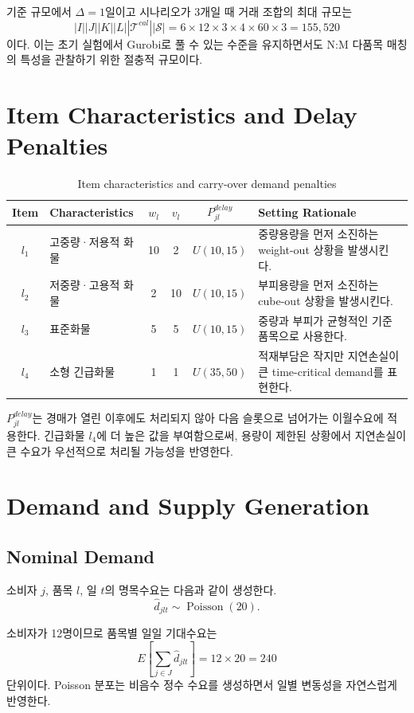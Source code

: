 \documentclass[11pt,a4paper]{article}
\begin{document}
기준 규모에서 $\Delta=1$일이고 시나리오가 3개일 때 거래 조합의 최대 규모는
\[
|I||J||K||L||\mathcal{T}^{cal}||\mathcal{S}|
=6\times12\times3\times4\times60\times3
=155{,}520
\]
이다. 이는 초기 실험에서 Gurobi로 풀 수 있는 수준을 유지하면서도 N:M 다품목 매칭의 특성을 관찰하기 위한 절충적 규모이다.

\section{Item Characteristics and Delay Penalties}

\begin{table}[h!]
\centering
\begin{tabularx}{\textwidth}{clcccY}
\toprule
\textbf{Item} & \textbf{Characteristics} & $w_l$ & $v_l$ & $P^{delay}_{jl}$ & \textbf{Setting Rationale} \\
\midrule
$l_1$ & 고중량·저용적 화물 & 10 & 2 & $U(10,15)$ & 중량용량을 먼저 소진하는 weight-out 상황을 발생시킨다. \\
$l_2$ & 저중량·고용적 화물 & 2 & 10 & $U(10,15)$ & 부피용량을 먼저 소진하는 cube-out 상황을 발생시킨다. \\
$l_3$ & 표준화물 & 5 & 5 & $U(10,15)$ & 중량과 부피가 균형적인 기준 품목으로 사용한다. \\
$l_4$ & 소형 긴급화물 & 1 & 1 & $U(35,50)$ & 적재부담은 작지만 지연손실이 큰 time-critical demand를 표현한다. \\
\bottomrule
\end{tabularx}
\caption{Item characteristics and carry-over demand penalties}
\end{table}

$P^{delay}_{jl}$는 경매가 열린 이후에도 처리되지 않아 다음 슬롯으로 넘어가는 이월수요에 적용한다. 긴급화물 $l_4$에 더 높은 값을 부여함으로써, 용량이 제한된 상황에서 지연손실이 큰 수요가 우선적으로 처리될 가능성을 반영한다.

\section{Demand and Supply Generation}

\subsection{Nominal Demand}
소비자 $j$, 품목 $l$, 일 $t$의 명목수요는 다음과 같이 생성한다.
\[
\hat d_{jlt}\sim \operatorname{Poisson}(20).
\]

소비자가 12명이므로 품목별 일일 기대수요는
\[
E\left[\sum_{j\in J}\hat d_{jlt}\right]
=12\times20=240
\]
단위이다. Poisson 분포는 비음수 정수 수요를 생성하면서 일별 변동성을 자연스럽게 반영한다.
\end{document}
